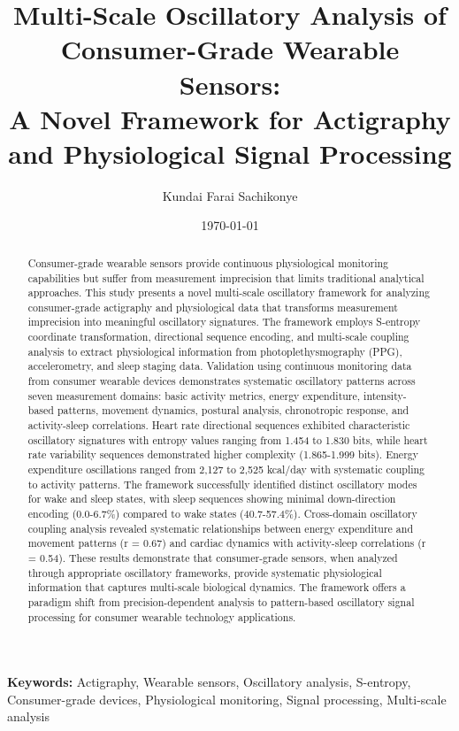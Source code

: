 \documentclass[12pt,a4paper]{article}
\title{
    \Large \textbf{Multi-Scale Oscillatory Analysis of Consumer-Grade Wearable Sensors: \\
    A Novel Framework for Actigraphy and Physiological Signal Processing}
}
\author{
    Kundai Farai Sachikonye \\
}
\date{\today}
\theoremstyle{definition}
\begin{document}
\maketitle

\begin{abstract}
Consumer-grade wearable sensors provide continuous physiological monitoring capabilities but suffer from measurement imprecision that limits traditional analytical approaches. This study presents a novel multi-scale oscillatory framework for analyzing consumer-grade actigraphy and physiological data that transforms measurement imprecision into meaningful oscillatory signatures. The framework employs S-entropy coordinate transformation, directional sequence encoding, and multi-scale coupling analysis to extract physiological information from photoplethysmography (PPG), accelerometry, and sleep staging data. Validation using continuous monitoring data from consumer wearable devices demonstrates systematic oscillatory patterns across seven measurement domains: basic activity metrics, energy expenditure, intensity-based patterns, movement dynamics, postural analysis, chronotropic response, and activity-sleep correlations. Heart rate directional sequences exhibited characteristic oscillatory signatures with entropy values ranging from 1.454 to 1.830 bits, while heart rate variability sequences demonstrated higher complexity (1.865-1.999 bits). Energy expenditure oscillations ranged from 2,127 to 2,525 kcal/day with systematic coupling to activity patterns. The framework successfully identified distinct oscillatory modes for wake and sleep states, with sleep sequences showing minimal down-direction encoding (0.0-6.7\%) compared to wake states (40.7-57.4\%). Cross-domain oscillatory coupling analysis revealed systematic relationships between energy expenditure and movement patterns (r = 0.67) and cardiac dynamics with activity-sleep correlations (r = 0.54). These results demonstrate that consumer-grade sensors, when analyzed through appropriate oscillatory frameworks, provide systematic physiological information that captures multi-scale biological dynamics. The framework offers a paradigm shift from precision-dependent analysis to pattern-based oscillatory signal processing for consumer wearable technology applications.
\end{abstract}

\textbf{Keywords:} Actigraphy, Wearable sensors, Oscillatory analysis, S-entropy, Consumer-grade devices, Physiological monitoring, Signal processing, Multi-scale analysis
\end{document}
